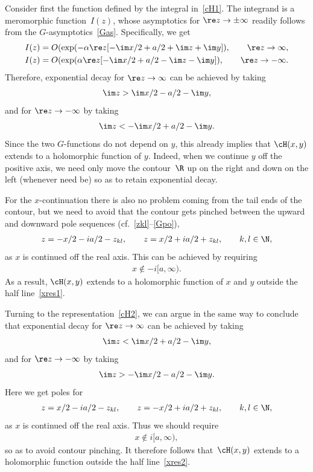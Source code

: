 \documentclass[pdftex]{sigma}
\numberwithin{equation}{section}
\begin{document}
Consider f\/irst the function def\/ined by the integral in~\eqref{cH1}. The integrand is a meromorphic function~$I(z)$, whose asymptotics for $\re z\to\pm\infty$ readily follows from the $G$-asymptotics~\eqref{Gas}. Specif\/ically, we get
\begin{gather}
I(z)=O(\exp(-\alpha \re z[-\im x/2+a/2+\im z+\im y]),\qquad \re z\to\infty,
\\
I(z)=O(\exp(\alpha \re z[-\im x/2+a/2-\im z-\im y]),\qquad \re z\to -\infty.
\end{gather}
Therefore, exponential decay for $\re z\to\infty$ can be achieved by taking
\begin{gather}\label{tailr1}
\im z>\im x/2 -a/2-\im y,
\end{gather}
and for $\re z\to -\infty$ by taking
\begin{gather}
\im z<-\im x/2 +a/2-\im y.
\end{gather}
Since the two $G$-functions do not depend on $y$, this already implies that $\cH(x,y)$ extends to a holomorphic function of $y$. Indeed, when we continue $y$ of\/f the positive axis, we need only move the contour~$\R$ up on the right and down on the left (whenever need be) so as to retain exponential decay.

For the $x$-continuation there is also no problem coming from the tail ends of the contour, but we need to avoid that the contour gets pinched between the upward and downward pole sequences (cf.~\eqref{zkl}--\eqref{Gpo}),
\begin{gather}
z=-x/2-ia/2-z_{kl},\qquad z=x/2+ia/2+z_{kl},\qquad k,l\in\N,
\end{gather}
as $x$ is continued of\/f the real axis. This can be achieved by requiring
\begin{gather}\label{xres1}
x\notin -i[a,\infty).
\end{gather}
As a result, $\cH(x,y)$ extends to a holomorphic function of $x$ and $y$ outside the half line~\eqref{xres1}.

Turning to the representation~\eqref{cH2}, we can argue in the same way to conclude that
exponential decay for $\re z\to\infty$ can be achieved by taking
\begin{gather}\label{br}
\im z<\im x/2 +a/2-\im y,
\end{gather}
and for $\re z\to -\infty$ by taking
\begin{gather}\label{bl}
\im z>-\im x/2 -a/2-\im y.
\end{gather}
Here we get poles for
\begin{gather}\label{zxpo}
z=x/2-ia/2-z_{kl},\qquad z=-x/2+ia/2+z_{kl},\qquad k,l\in\N,
\end{gather}
as $x$ is continued of\/f the real axis. Thus we should require
\begin{gather}\label{xres2}
x\notin i[a,\infty),
\end{gather}
so as to avoid contour pinching. It therefore follows that~$\cH(x,y)$ extends to a holomorphic function outside the half line~\eqref{xres2}.
\end{document}
